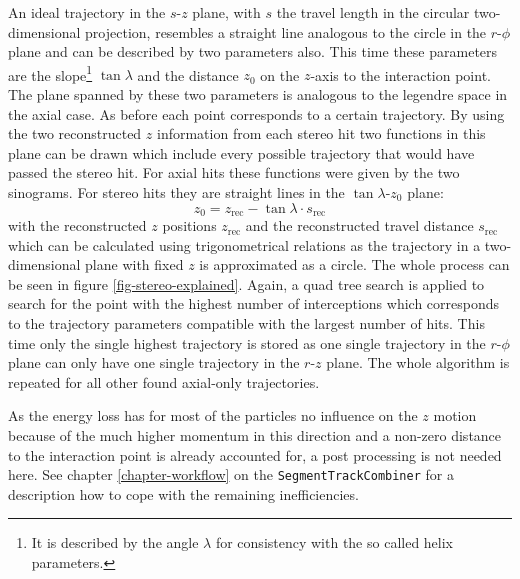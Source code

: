 An ideal trajectory in the $s$-$z$ plane, with $s$ the travel length in the circular two-dimensional projection, resembles a straight line analogous to the circle in the $r$-$\phi$ plane and can be described by two parameters also. This time these parameters are the slope\footnote{It is described by the angle $\lambda$ for consistency with the so called helix parameters.} $\tan \lambda$ and the distance $z_0$ on the $z$-axis to the interaction point. The plane spanned by these two parameters is analogous to the legendre space in the axial case. As before each point corresponds to a certain trajectory. By using the two reconstructed $z$ information from each stereo hit two functions in this plane can be drawn which include every possible trajectory that would have passed the stereo hit. For axial hits these functions were given by the two sinograms. For stereo hits they are straight lines in the $\tan \lambda$-$z_0$ plane:
$$ z_0 = z_\text{rec} - \tan \lambda \cdot s_\text{rec} $$
with the reconstructed $z$ positions $z_\text{rec}$ and the reconstructed travel distance $s_\text{rec}$ which can be calculated using trigonometrical relations as the trajectory in a two-dimensional plane with fixed $z$ is approximated as a circle. The whole process can be seen in figure \ref{fig-stereo-explained}. Again, a quad tree search is applied to search for the point with the highest number of interceptions which corresponds to the trajectory parameters compatible with the largest number of hits. This time only the single highest trajectory is stored as one single trajectory in the $r$-$\phi$ plane can only have one single trajectory in the $r$-$z$ plane. The whole algorithm is repeated for all other found axial-only trajectories. 

As the energy loss has for most of the particles no influence on the $z$ motion because of the much higher momentum in this direction and a non-zero distance to the interaction point is already accounted for, a post processing is not needed here. See chapter \ref{chapter-workflow} on the \texttt{SegmentTrackCombiner} for a description how to cope with the remaining inefficiencies.


